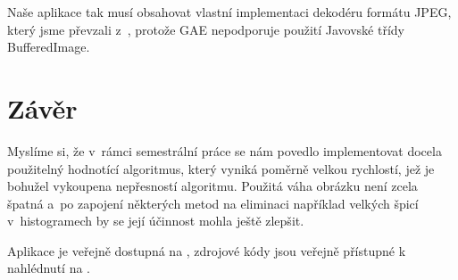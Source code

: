 \documentclass[12pt,oneside,a4paper]{article}
\begin{document}
Naše aplikace tak musí obsahovat vlastní implementaci dekodéru formátu JPEG, který jsme převzali z~\cite{Dersch}, protože GAE nepodporuje použití Javovské třídy BufferedImage.

\section{Závěr}

Myslíme si, že v~rámci semestrální práce se nám povedlo implementovat docela použitelný hodnotící algoritmus, který vyniká poměrně velkou rychlostí, jež je bohužel vykoupena nepřesností algoritmu. Použitá váha obrázku není zcela špatná a~po zapojení některých metod na eliminaci například velkých špicí v~histogramech by se její účinnost mohla ještě zlepšit.

Aplikace je veřejně dostupná na \cite{liveApp}, zdrojové kódy jsou veřejně přístupné k nahlédnutí na \cite{official}.

\renewcommand{\refname}{Literatura}

{
 
}
\end{document}
